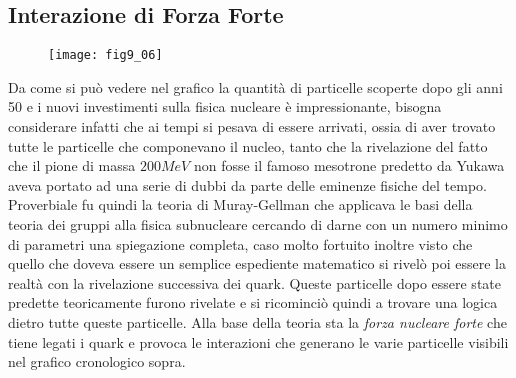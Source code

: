\subsection{Interazione di Forza Forte}
\begin{figure}
\centering
\texttt{[image: fig9\_06]}
\end{figure}

Da come si può vedere nel grafico la quantità di particelle scoperte dopo gli anni 50 e i nuovi investimenti sulla fisica nucleare è impressionante, bisogna considerare infatti che ai tempi si pesava di essere arrivati, ossia di aver trovato tutte le particelle che componevano il nucleo, tanto che la rivelazione del fatto che il pione di massa $200MeV$ non fosse il famoso mesotrone predetto da Yukawa aveva portato ad una serie di dubbi da parte delle eminenze fisiche del tempo.
Proverbiale fu quindi la teoria di Muray-Gellman che applicava le basi della teoria dei gruppi alla fisica subnucleare cercando di darne con un numero minimo di parametri una spiegazione completa, caso molto fortuito inoltre visto che quello che doveva essere un semplice espediente matematico si rivelò poi essere la realtà con la rivelazione successiva dei quark.
Queste particelle dopo essere state predette teoricamente furono rivelate e si ricominciò quindi a trovare una logica dietro tutte queste particelle.
Alla base della teoria sta la \emph{forza nucleare forte} che tiene legati i quark e provoca le interazioni che generano le varie particelle visibili nel grafico cronologico sopra.

